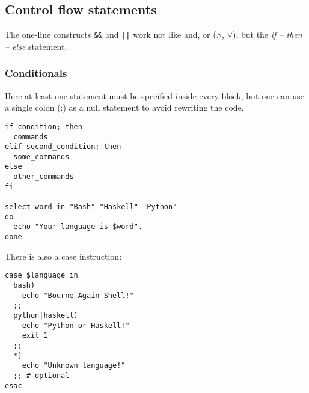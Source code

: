 \vfill\null
\columnbreak

\subsection{Control flow statements}
The one-line constructs \texttt{\&\&} and \texttt{||} work not like and, or ($\wedge$, $\vee$), but the \emph{if -- then -- else} statement.

\subsubsection{Conditionals}
Here at least one statement must be specified inside every block,
but one can use a single colon (:) as a null statement to avoid
rewriting the code.

\begin{verbatim}
if condition; then
  commands
elif second_condition; then
  some_commands
else
  other_commands	
fi

select word in "Bash" "Haskell" "Python"
do
  echo "Your language is $word".
done
\end{verbatim}

There is also a case instruction:
\begin{verbatim}
case $language in
  bash)
    echo "Bourne Again Shell!"
  ;;
  python|haskell)
    echo "Python or Haskell!"
    exit 1
  ;;
  *)
    echo "Unknown language!"
  ;; # optional
esac
\end{verbatim}

